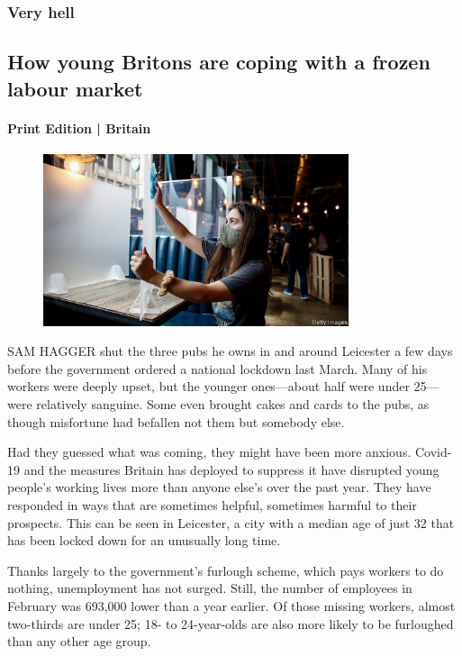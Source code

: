 \documentclass{article}
\begin{document}
\subsubsection{Very hell }
\subsection{How young Britons are coping with a frozen labour market }
\paragraph{Print Edition | Britain  \quad \color{gray}{Mar 25th 2021 }}
\begin{figure}[h]
\centering
\includegraphics[width=0.8\textwidth]{images/20210327_brp504.jpg}
\end{figure}
\lettrine{S}AM HAGGER shut the three pubs he owns in and around Leicester a few days before the government ordered a national lockdown last March. Many of his workers were deeply upset, but the younger ones---about half were under 25---were relatively sanguine. Some even brought cakes and cards to the pubs, as though misfortune had befallen not them but somebody else. 

Had they guessed what was coming, they might have been more anxious. Covid-19 and the measures Britain has deployed to suppress it have disrupted young people's working lives more than anyone else's over the past year. They have responded in ways that are sometimes helpful, sometimes harmful to their prospects. This can be seen in Leicester, a city with a median age of just 32 that has been locked down for an unusually long time. 

Thanks largely to the government's furlough scheme, which pays workers to do nothing, unemployment has not surged. Still, the number of employees in February was 693,000 lower than a year earlier. Of those missing workers, almost two-thirds are under 25; 18- to 24-year-olds are also more likely to be furloughed than any other age group. 
\end{document}
